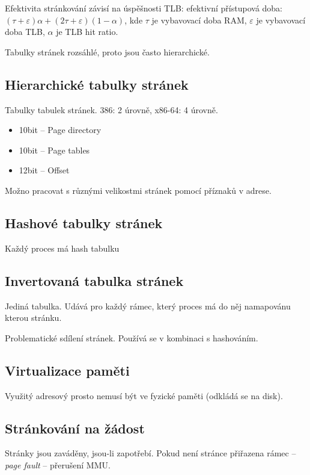 \documentclass[a4wide]{report}
\begin{document}
Efektivita stránkování závisí na úspěšnosti TLB: efektivní přístupová doba: $(\tau + \varepsilon)\alpha + (2\tau + \varepsilon)(1-\alpha)$, kde $\tau$ je vybavovací doba RAM, $\varepsilon$ je vybavovací doba TLB, $\alpha$ je TLB hit ratio.

Tabulky stránek rozsáhlé, proto jsou často hierarchické.

\subsection{Hierarchické tabulky stránek}

Tabulky tabulek stránek. 386: 2 úrovně, x86-64: 4 úrovně.
\begin{itemize}
	\item 10bit -- Page directory
	\item 10bit -- Page tables
	\item 12bit -- Offset
\end{itemize}

Možno pracovat s různými velikostmi stránek pomocí příznaků v adrese.

\subsection{Hashové tabulky stránek}

Každý proces má hash tabulku

\subsection{Invertovaná tabulka stránek}

Jediná tabulka. Udává pro každý rámec, který proces má do něj namapovánu kterou stránku.

Problematické sdílení stránek. Používá se v kombinaci s hashováním.

\subsection{Virtualizace paměti}

Využitý adresový prosto nemusí být ve fyzické paměti (odkládá se na disk).

\subsection{Stránkování na žádost}

Stránky jsou zaváděny, jsou-li zapotřebí. Pokud není stránce přiřazena rámec -- \emph{page fault} -- přerušení MMU.
\end{document}

